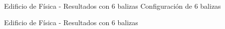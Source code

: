 \documentclass[xcolor=table]{beamer}
\begin{document}
  \begin{frame}{Edificio de Física - Resultados con 6 balizas}
    Configuración de 6 balizas
    \begin{figure}[H]
      \centering
      \def\svgwidth{0.5\linewidth}
       
      \label{fig:sensores_fisica_6}
    \end{figure}
  \end{frame}

  \begin{frame}{Edificio de Física - Resultados con 6 balizas}
    \begin{figure}[H]
      \centering
      \scalebox{0.6}{}
      \label{fig:res_fisica_6}
  \end{figure}
  \end{frame}
\end{document}
